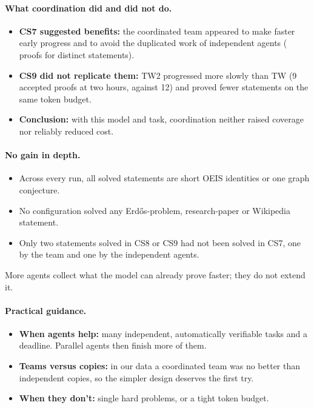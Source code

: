 \documentclass[11pt]{article}
\begin{document}
\paragraph{What coordination did and did not do.}
\begin{itemize}
  \item \textbf{CS7 suggested benefits:} the coordinated team appeared to make faster early progress and to avoid the
    duplicated work of independent agents (\CSeightSum{} proofs for \CSeightUnion{} distinct statements).
  \item \textbf{CS9 did not replicate them:} TW2 progressed more slowly than TW (9 accepted proofs at two hours,
    against 12) and proved fewer statements on the same token budget.
  \item \textbf{Conclusion:} with this model and task, coordination neither raised coverage nor reliably reduced cost.
\end{itemize}

\paragraph{No gain in depth.}
\begin{itemize}
  \item Across every run, all solved statements are short OEIS identities or one graph conjecture.
  \item No configuration solved any Erd\H{o}s-problem, research-paper or Wikipedia statement.
  \item Only two statements solved in CS8 or CS9 had not been solved in CS7, one by the team and one by the independent
    agents.
\end{itemize}
More agents collect what the model can already prove faster; they do not extend it.

\paragraph{Practical guidance.}
\begin{itemize}
  \item \textbf{When agents help:} many independent, automatically verifiable tasks and a deadline. Parallel agents then
    finish more of them.
  \item \textbf{Teams versus copies:} in our data a coordinated team was no better than independent copies, so the
    simpler design deserves the first try.
  \item \textbf{When they don't:} single hard problems, or a tight token budget.
\end{itemize}
\end{document}
